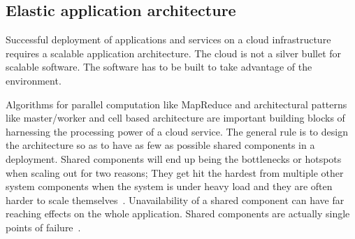 \documentclass[english]{tktltiki2}
\theoremstyle{definition}
\theoremstyle{remark}
\begin{document}



\subsection{Elastic application architecture}
\label{sec:elasticApplicationArchitecture}

Successful deployment of applications and services on a cloud infrastructure
requires a scalable application architecture. The cloud is not a silver bullet
for scalable software. The software has to be built to take advantage of the
environment.

Algorithms for parallel computation like MapReduce and architectural patterns
like master/worker and cell based architecture  are important building blocks of
harnessing the processing power of a cloud service. The general rule is to
design the architecture so as to have as few as possible shared components in a
deployment. Shared components will end up being the bottlenecks or hotspots when
scaling out for two reasons; They get hit the hardest from multiple other system
components when the system is under heavy load and they are often harder to
scale themselves~\cite{caseforsharednothing}. Unavailability of a
shared component can have far reaching effects on the whole application. Shared
components are actually single points of failure~\cite{cloudarchitecturepatternsbook}.
\end{document}

